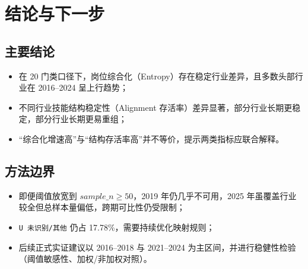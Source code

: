 \documentclass[12pt,a4paper]{ctexart}
\begin{document}
\section{结论与下一步}
\subsection{主要结论}
\begin{itemize}
    \item 在 20 门类口径下，岗位综合化（Entropy）存在稳定行业差异，且多数头部行业在 2016--2024 呈上行趋势；
    \item 不同行业技能结构稳定性（Alignment 存活率）差异显著，部分行业长期更稳定，部分行业长期更易重组；
    \item “综合化增速高”与“结构存活率高”并不等价，提示两类指标应联合解释。
\end{itemize}

\subsection{方法边界}
\begin{itemize}
    \item 即便阈值放宽到 $sample\_n \geq 50$，2019 年仍几乎不可用，2025 年虽覆盖行业较全但总样本量偏低，跨期可比性仍受限制；
    \item \texttt{U 未识别/其他} 仍占 17.78\%，需要持续优化映射规则；
    \item 后续正式实证建议以 2016--2018 与 2021--2024 为主区间，并进行稳健性检验（阈值敏感性、加权/非加权对照）。
\end{itemize}
\end{document}
